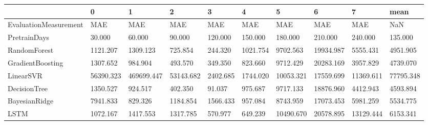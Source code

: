 \begin{tabular}{llllllllll}
\toprule
{} &         0 &          1 &         2 &        3 &        4 &         5 &         6 &         7 &      mean \\
\midrule
EvaluationMeasurement &       MAE &        MAE &       MAE &      MAE &      MAE &       MAE &       MAE &       MAE &       NaN \\
PretrainDays          &    30.000 &     60.000 &    90.000 &  120.000 &  150.000 &   180.000 &   210.000 &   240.000 &   135.000 \\
RandomForest          &  1121.207 &   1309.123 &   725.854 &  244.320 & 1021.754 &  9702.563 & 19934.987 &  5555.431 &  4951.905 \\
GradientBoosting      &  1307.652 &    984.904 &   493.570 &  349.350 &  823.660 &  9712.429 & 20283.169 &  3957.829 &  4739.070 \\
LinearSVR             & 56390.323 & 469699.447 & 53143.682 & 2402.685 & 1744.020 & 10053.321 & 17559.699 & 11369.611 & 77795.348 \\
DecisionTree          &  1350.527 &    924.517 &   402.350 &   91.037 &  975.687 &  9717.133 & 18876.960 &  4412.943 &  4593.894 \\
BayesianRidge         &  7941.833 &    829.326 &  1184.854 & 1566.433 &  957.084 &  8743.959 & 17073.453 &  5981.259 &  5534.775 \\
LSTM                  &  1072.167 &   1417.553 &  1317.785 &  570.977 &  649.239 & 10490.670 & 20578.895 & 13129.444 &  6153.341 \\
\bottomrule
\end{tabular}
